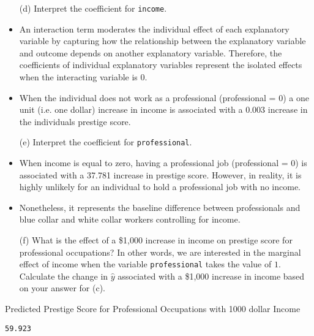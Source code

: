 \documentclass[12pt,letterpaper]{article}
\begin{document}
\begin{enumerate}
	\item [(d)]
	Interpret the coefficient for \texttt{income}.
\end{enumerate}
\begin{itemize}[left=0pt]
	\item 
	An interaction term moderates the individual effect of each explanatory variable by capturing how the relationship between the explanatory variable and outcome depends on another explanatory variable. Therefore, the coefficients of individual explanatory variables represent the isolated effects when the interacting variable is 0. 
	\item
	When the individual does not work as a professional (professional = 0) a one unit (i.e. one dollar) increase in income is associated with a 0.003 increase in the individuals prestige score.
\end{itemize}
\begin{enumerate}
	\item [(e)]
	Interpret the coefficient for \texttt{professional}.
\end{enumerate}	
\begin{itemize}[left=0pt]
	\item 
	When income is equal to zero, having a professional job (professional = 0) is associated with a 37.781 increase in prestige score. However, in reality, it is highly unlikely for an individual to hold a professional job with no income. 
	\item 
	Nonetheless, it represents the baseline difference between professionals and blue collar and white collar workers controlling for income. 
\end{itemize}


\begin{enumerate}
	\item [(f)]
	What is the effect of a \$1,000 increase in income on prestige score for professional occupations? In other words, we are interested in the marginal effect of income when the variable \texttt{professional} takes the value of $1$. Calculate the change in $\hat{y}$ associated with a \$1,000 increase in income based on your answer for (c).
\end{enumerate}		
\noindent Predicted Prestige Score for Professional Occupations with 1000 dollar Income

\begin{verbatim}
59.923
\end{verbatim}
\end{document}

